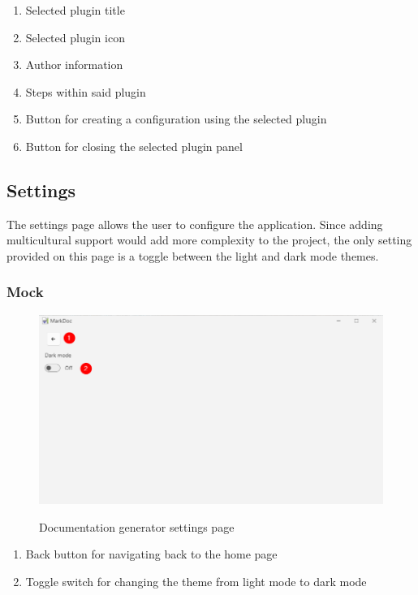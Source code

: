 \begin{enumerate}
    \item Selected plugin title
    \item Selected plugin icon
    \item Author information
    \item Steps within said plugin
    \item Button for creating a configuration using the selected plugin
    \item Button for closing the selected plugin panel
\end{enumerate}

\subsection{Settings}

The settings page allows the user to configure the application. Since adding multicultural support would add more complexity to the project, the only setting provided on this page is a toggle between the light and dark mode themes.

\subsubsection{Mock}

\begin{figure}[H]
    \includegraphics[width=\linewidth]{img/markDocSettings.png}
    \label{fig:settingsPage}
    \caption{Documentation generator settings page}
\end{figure}

\begin{enumerate}
    \item Back button for navigating back to the home page
    \item Toggle switch for changing the theme from light mode to dark mode
\end{enumerate}

